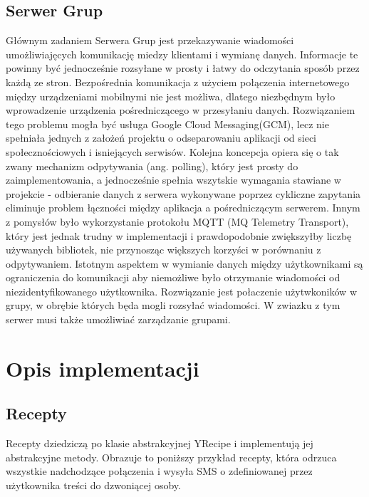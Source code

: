 \documentclass[11pt,a4paper,polish,thesis]{dcsbook}
\begin{document}
\section{Serwer Grup}
Głównym zadaniem Serwera Grup jest przekazywanie wiadomości umożliwiajęcych komunikację miedzy klientami i wymianę danych. 
Informacje te powinny być jednocześnie rozsyłane w prosty i łatwy do odczytania sposób przez każdą ze stron.
Bezpośrednia komunikacja z użyciem połączenia internetowego między urządzeniami mobilnymi nie jest możliwa, dlatego niezbędnym było wprowadzenie urządzenia pośredniczącego w przesyłaniu danych. 
Rozwiązaniem tego problemu mogła być usługa Google Cloud Messaging(GCM), lecz nie spełniała jednych z założeń projektu o odseparowaniu aplikacji od sieci społecznościowych i isniejących serwisów.
Kolejna koncepcja opiera się o tak zwany mechanizm odpytywania (ang. polling), który jest prosty do zaimplementowania, a jednocześnie spełnia wszytskie wymagania stawiane w projekcie - odbieranie danych z serwera wykonywane poprzez cykliczne zapytania eliminuje problem łączności między aplikacja a pośredniczącym serwerem.
Innym z pomysłów było wykorzystanie protokołu MQTT (MQ Telemetry Transport), który jest jednak trudny w implementacji i prawdopodobnie zwiększyłby liczbę używanych bibliotek, nie przynosząc większych korzyści w porównaniu z odpytywaniem.
Istotnym aspektem w wymianie danych między użytkownikami są ograniczenia do komunikacji aby niemożliwe było otrzymanie wiadomości od niezidentyfikowanego użytkownika.
Rozwiązanie jest połaczenie użytwkoników w grupy, w obrębie których będa mogli rozsyłać wiadomości. W zwiazku z tym serwer musi także umożliwiać zarządzanie grupami.

\chapter{Opis implementacji}

\section{Recepty}
Recepty dziedziczą po klasie abstrakcyjnej YRecipe i implementują jej abstrakcyjne metody. Obrazuje to poniższy przykład recepty, która odrzuca wszystkie nadchodzące połączenia i wysyła SMS o zdefiniowanej przez użytkownika treści do dzwoniącej osoby.
\end{document}

